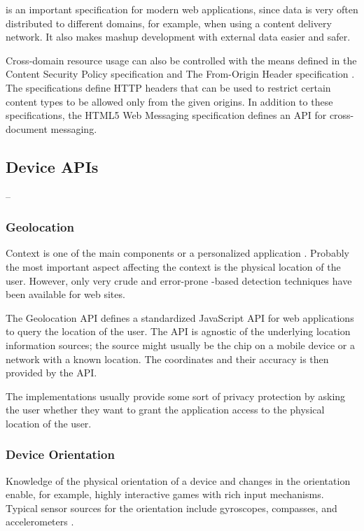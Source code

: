  is an important specification for modern web applications,
since data is very often distributed to different domains, for
example, when using a content delivery network. It also makes mashup
development with external data easier and safer.

Cross-domain resource usage can also be controlled with the means
defined in the Content Security Policy specification
\cite{ContentSecurityPolicy} and The From-Origin Header specification
\cite{FromOriginHeader}. The specifications define HTTP headers that
can be used to restrict certain content types to be allowed only from
the given origins. In addition to these specifications, the HTML5 Web
Messaging specification \cite{WebMessaging} defines an API for
cross-document messaging.

\subsection{Device APIs}

--

\subsubsection{Geolocation}

Context is one of the main components or a personalized application
\cite{fling2009mobile}. Probably the most important aspect affecting
the context is the physical location of the user. However, only very
crude and error-prone -based detection techniques have been
available for web sites.

The Geolocation API defines a standardized JavaScript API for web
applications to query the location of the user. The API is agnostic of
the underlying location information sources; the source might usually
be the  chip on a mobile device or a  network
with a known location. The coordinates and their accuracy is then
provided by the API. \cite{geolocationAPI}

The implementations usually provide some sort of privacy protection by
asking the user whether they want to grant the application access to
the physical location of the user.

\subsubsection{Device Orientation}

Knowledge of the physical orientation of a device and changes in the
orientation enable, for example, highly interactive games with rich
input mechanisms. Typical sensor sources for the orientation include
gyroscopes, compasses, and accelerometers \cite{DeviceOrientation}.

